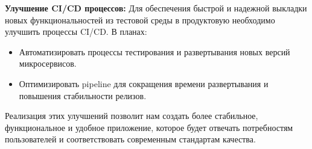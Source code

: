 \textbf{Улучшение CI/CD процессов:}
Для обеспечения быстрой и надежной выкладки новых функциональностей из тестовой среды в продуктовую необходимо улучшить процессы CI/CD. В планах:
\begin{itemize}
    \item Автоматизировать процессы тестирования и развертывания новых версий микросервисов.
    \item Оптимизировать pipeline для сокращения времени развертывания и повышения стабильности релизов.
\end{itemize}

Реализация этих улучшений позволит нам создать более стабильное, функциональное и удобное приложение, которое будет отвечать потребностям пользователей и соответствовать современным стандартам качества.

